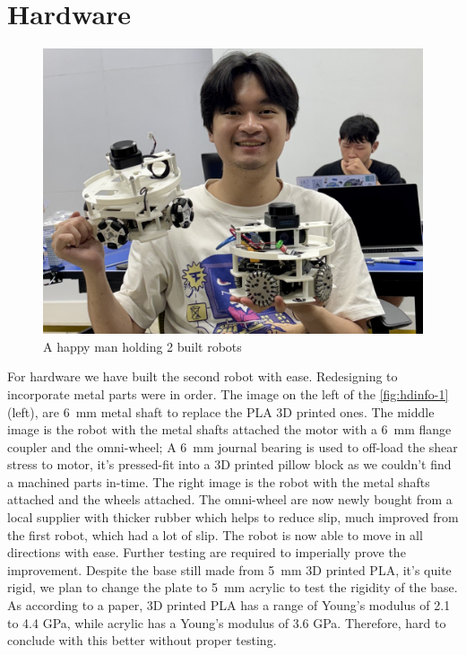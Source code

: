 \chapter{Hardware}

\begin{figure} [H]
    \centering
    \includegraphics[width=0.65\linewidth]{assets/images/hardware/IMG_8290.jpeg}
    \caption{A happy man holding 2 built robots}
    \label{fig:have2robots}
\end{figure}
For hardware we have built the second robot with ease. Redesigning to incorporate metal parts were in order. The image on the left of the \ref{fig:hdinfo-1}(left), are 6 mm metal shaft to replace the PLA 3D printed ones. The middle image is the robot with the metal shafts attached the motor with a 6 mm flange coupler and the omni-wheel; A 6 mm journal bearing is used to off-load the shear stress to motor, it's pressed-fit into a 3D printed pillow block as we couldn't find a machined parts in-time. The right image is the robot with the metal shafts attached and the wheels attached. 
The omni-wheel are now newly bought from a local supplier with thicker rubber which helps to reduce slip, much improved from the first robot, which had a lot of slip. The robot is now able to move in all directions with ease. Further testing are required to imperially prove the improvement. Despite the base still made from 5 mm 3D printed PLA, it's quite rigid, we plan to change the plate to 5 mm acrylic to test the rigidity of the base. As according to a paper, 3D printed PLA has a range of Young's modulus of 2.1 to 4.4 GPa, while acrylic has a Young's modulus of 3.6 GPa. Therefore, hard to conclude with this better without proper testing. 

